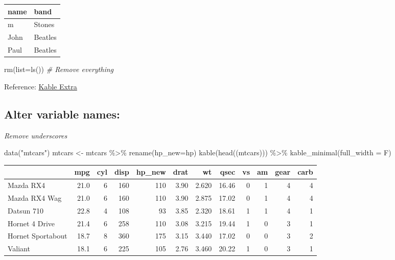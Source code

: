 \documentclass[
]{article}
\newenvironment{Shaded}{\begin{snugshade}}{\end{snugshade}}
\newcommand{\AttributeTok}[1]{\textcolor[rgb]{0.77,0.63,0.00}{#1}}
\newcommand{\CommentTok}[1]{\textcolor[rgb]{0.56,0.35,0.01}{\textit{#1}}}
\newcommand{\FunctionTok}[1]{\textcolor[rgb]{0.00,0.00,0.00}{#1}}
\newcommand{\NormalTok}[1]{#1}
\newcommand{\OtherTok}[1]{\textcolor[rgb]{0.56,0.35,0.01}{#1}}
\newcommand{\SpecialCharTok}[1]{\textcolor[rgb]{0.00,0.00,0.00}{#1}}
\newcommand{\StringTok}[1]{\textcolor[rgb]{0.31,0.60,0.02}{#1}}
\begin{document}
\begin{table}
\centering
\begin{tabular}{l|l}
\hline
name & band\\
\hline
m & Stones\\
\hline
John & Beatles\\
\hline
Paul & Beatles\\
\hline
\end{tabular}
\end{table}

\begin{Shaded}
\begin{Highlighting}[]
\FunctionTok{rm}\NormalTok{(}\AttributeTok{list=}\FunctionTok{ls}\NormalTok{()) }\CommentTok{\# Remove everything}
\end{Highlighting}
\end{Shaded}

Reference: \href{https://cran.r-project.org/web/packages/kableExtra/vignettes/awesome_table_in_html.html}{Kable Extra}

\hypertarget{alter-variable-names}{%
\subsection{Alter variable names:}\label{alter-variable-names}}

\emph{Remove underscores}

\begin{Shaded}
\begin{Highlighting}[]
\FunctionTok{data}\NormalTok{(}\StringTok{"mtcars"}\NormalTok{)}
\NormalTok{mtcars }\OtherTok{\textless{}{-}}\NormalTok{ mtcars }\SpecialCharTok{\%\textgreater{}\%} \FunctionTok{rename}\NormalTok{(}\AttributeTok{hp\_new=}\NormalTok{hp)}
\FunctionTok{kable}\NormalTok{(}\FunctionTok{head}\NormalTok{((mtcars))) }\SpecialCharTok{\%\textgreater{}\%} \FunctionTok{kable\_minimal}\NormalTok{(}\AttributeTok{full\_width =}\NormalTok{ F)}
\end{Highlighting}
\end{Shaded}

\begin{table}
\centering
\begin{tabular}{l|r|r|r|r|r|r|r|r|r|r|r}
\hline
  & mpg & cyl & disp & hp\_new & drat & wt & qsec & vs & am & gear & carb\\
\hline
Mazda RX4 & 21.0 & 6 & 160 & 110 & 3.90 & 2.620 & 16.46 & 0 & 1 & 4 & 4\\
\hline
Mazda RX4 Wag & 21.0 & 6 & 160 & 110 & 3.90 & 2.875 & 17.02 & 0 & 1 & 4 & 4\\
\hline
Datsun 710 & 22.8 & 4 & 108 & 93 & 3.85 & 2.320 & 18.61 & 1 & 1 & 4 & 1\\
\hline
Hornet 4 Drive & 21.4 & 6 & 258 & 110 & 3.08 & 3.215 & 19.44 & 1 & 0 & 3 & 1\\
\hline
Hornet Sportabout & 18.7 & 8 & 360 & 175 & 3.15 & 3.440 & 17.02 & 0 & 0 & 3 & 2\\
\hline
Valiant & 18.1 & 6 & 225 & 105 & 2.76 & 3.460 & 20.22 & 1 & 0 & 3 & 1\\
\hline
\end{tabular}
\end{table}
\end{document}

